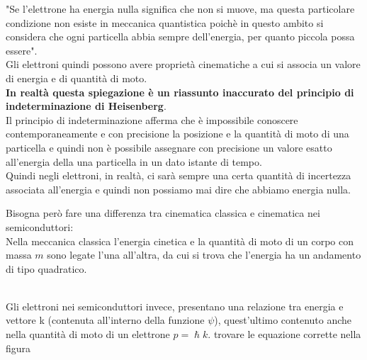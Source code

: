 \begin{psbox}
"Se l'elettrone ha energia nulla significa che non si muove, ma questa particolare condizione non esiste in meccanica quantistica poichè in questo ambito si considera che ogni particella abbia sempre dell'energia, per quanto piccola possa essere".\\
Gli elettroni quindi possono avere proprietà cinematiche a cui si associa un valore di energia e di quantità di moto.\\
%
\textbf{In realtà questa spiegazione è un riassunto inaccurato del principio di indeterminazione di Heisenberg}.\\
Il principio di indeterminazione afferma che è impossibile conoscere contemporaneamente e con precisione la posizione e la quantità di moto di una particella e quindi non è possibile assegnare con precisione un valore esatto all'energia della una particella in un dato istante di tempo.\\
Quindi negli elettroni, in realtà, ci sarà sempre una certa quantità di incertezza associata all'energia e quindi non possiamo mai dire che abbiamo energia nulla. 
\end{psbox}
%
Bisogna però fare una differenza tra cinematica classica e cinematica nei semiconduttori:\\
Nella meccanica classica l'energia cinetica e la quantità di moto di un corpo con massa $m$ sono legate l'una all'altra, da cui si trova che l'energia ha un andamento di tipo quadratico.
%
\begin{figure}[hbt!]
    \centering
\end{figure}\\

%
Gli elettroni nei semiconduttori invece, presentano una relazione tra energia e vettore k (contenuta all'interno della funzione $\psi$), quest'ultimo contenuto anche nella quantità di moto di un elettrone $p=\hslash k$. trovare le equazione corrette nella figura
\begin{figure}[hbt!]
    \centering
\end{figure}\\

